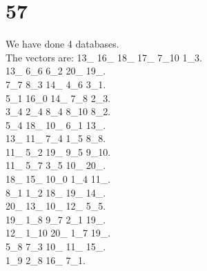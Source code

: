 \chapter{57}
\indent We have done 4 databases.\\
The vectors are:
13\_ 16\_ 18\_ 17\_ 7\_10 1\_3.\\13\_ 6\_6 6\_2 20\_ 19\_.\\7\_7 8\_3 14\_ 4\_6 3\_1.\\5\_1 16\_0 14\_ 7\_8 2\_3.\\3\_4 2\_4 8\_4 8\_10 8\_2.\\5\_4 18\_ 10\_ 6\_1 13\_.\\13\_ 11\_ 7\_4 1\_5 8\_8.\\11\_ 5\_2 19\_ 9\_5 9\_10.\\11\_ 5\_7 3\_5 10\_ 20\_.\\18\_ 15\_ 10\_0 1\_4 11\_.\\8\_1 1\_2 18\_ 19\_ 14\_.\\20\_ 13\_ 10\_ 12\_ 5\_5.\\19\_ 1\_8 9\_7 2\_1 19\_.\\12\_ 1\_10 20\_ 1\_7 19\_.\\5\_8 7\_3 10\_ 11\_ 15\_.\\1\_9 2\_8 16\_ 7\_1.\\